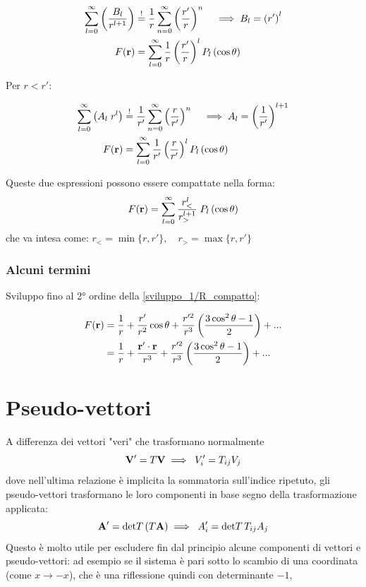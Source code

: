 \begin{align}
  \sum_{l=0}^{\infty} \left( \frac{B_l}{r^{l+1}} \right) & \overset{!}{=} \frac{1}{r} \sum_{n = 0}^{\infty} \left( \frac{r'}{r} \right)^n \quad \implies B_l = \left( r' \right)^l \\
  F(\mathbf{ r }) &= \sum_{l=0}^{\infty} \frac{1}{r} \left( \frac{r'}{r} \right) ^l P_l \left( \cos \theta \right)
\end{align}

Per $ r<r' $:

\begin{align}
  \sum_{l=0}^{\infty} \left( A_l \; r^l \right) & \overset{!}{=} \frac{1}{r'} \sum_{n = 0}^{\infty} \left( \frac{r}{r'} \right)^n \quad \implies A_l = \left( \frac{1}{r'} \right)^{l+1} \\
  F(\mathbf{ r }) &= \sum_{l=0}^{\infty} \frac{1}{r'} \left( \frac{r}{r'} \right) ^l P_l \left( \cos \theta \right)
\end{align}

Queste due espressioni possono essere compattate nella forma:
\begin{equation} \label{sviluppo_1/R_compatto}
  F(\mathbf{ r }) = \sum_{l=0}^{\infty} \frac{r_{<}^{l}}{r_{>}^{l+1}} \; P_l \left( \cos \theta \right)
\end{equation}
che va intesa come: $ r_< = \min\{r, r'\} , \quad r_> = \max\{r, r'\} $

\subsection{Alcuni termini}
Sviluppo fino al 2° ordine della \eqref{sviluppo_1/R_compatto}:

\begin{align}
  F(\mathbf{ r }) &= \frac{1}{r} + \frac{r'}{r^2} \cos \theta + \frac{r'^2}{r^3} \left( \frac{3\cos ^2 \theta -1}{2} \right) + ...\\
  &= \frac{1}{r} + \frac{\mathbf{ r' \cdot r }}{r^3} + \frac{r'^2}{r^3} \left( \frac{3\cos ^2 \theta -1}{2} \right) + ...
\end{align}


\chapter{Pseudo-vettori}
A differenza dei vettori "veri" che trasformano normalmente
\begin{equation}
  \mathbf{ V' } = T\mathbf{ V } \implies \; V'_i = T_{i j}V_j
\end{equation}
dove nell'ultima relazione è implicita la sommatoria sull'indice ripetuto, gli pseudo-vettori trasformano le loro componenti in base segno della 
trasformazione applicata:
\begin{equation}
  \mathbf{ A' } = \det \!T \left( T\mathbf{ A } \right) \implies \; A'_i = \det\!T \, T_{i j} A_j
\end{equation}
Questo è molto utile per escludere fin dal principio alcune componenti di vettori e pseudo-vettori:
ad esempio se il sistema è pari sotto lo scambio di una coordinata (come $ x \to -x $), che è una riflessione quindi con determinante $ -1 $, 

